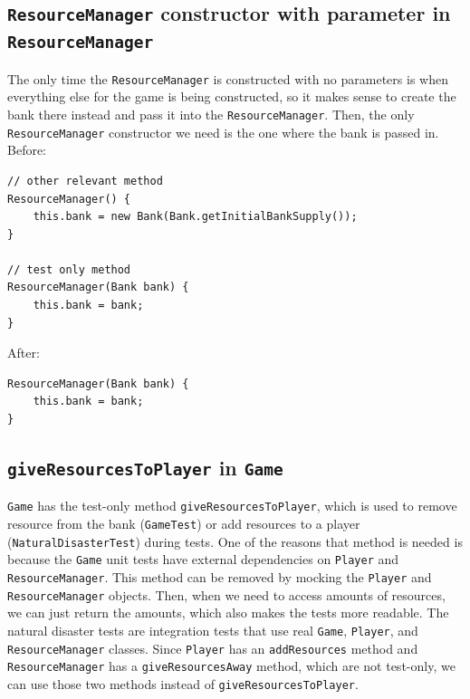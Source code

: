 \documentclass{fank1basedocument}
\begin{document}
\subsection*{\texttt{ResourceManager} constructor with parameter in \texttt{ResourceManager}}
The only time the \texttt{ResourceManager} is constructed with no parameters is when everything else for the game is being constructed, so it makes sense to create the bank there instead and pass it into the \texttt{ResourceManager}. Then, the only \texttt{ResourceManager} constructor we need is the one where the bank is passed in.\\

Before:
\begin{lstlisting}[style=javacode,language=myJava]
// other relevant method
ResourceManager() {
	this.bank = new Bank(Bank.getInitialBankSupply());
}

// test only method
ResourceManager(Bank bank) {
	this.bank = bank;
}
\end{lstlisting}
After:
\begin{lstlisting}[style=javacode,language=myJava]
ResourceManager(Bank bank) {
	this.bank = bank;
}
\end{lstlisting}
\subsection*{\texttt{giveResourcesToPlayer} in \texttt{Game}}
\texttt{Game} has the test-only method \texttt{giveResourcesToPlayer}, which is used to remove resource from the bank (\texttt{GameTest}) or add resources to a player (\texttt{NaturalDisasterTest}) during tests. One of the reasons that method is needed is because the \texttt{Game} unit tests have external dependencies on \texttt{Player} and \texttt{ResourceManager}. This method can be removed by mocking the \texttt{Player} and \texttt{ResourceManager} objects. Then, when we need to access amounts of resources, we can just return the amounts, which also makes the tests more readable. The natural disaster tests are integration tests that use real \texttt{Game}, \texttt{Player}, and \texttt{ResourceManager} classes. Since \texttt{Player} has an \texttt{addResources} method and \texttt{ResourceManager} has a \texttt{giveResourcesAway} method, which are not test-only, we can use those two methods instead of \texttt{giveResourcesToPlayer}.\\
\end{document}
